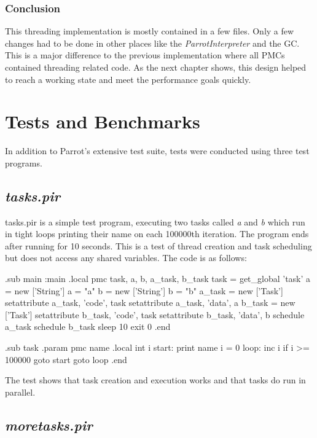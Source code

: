 \documentclass[bachelor,english]{hgbthesis}
\begin{document}
\subsection{Conclusion}

This threading implementation is mostly contained in a few files. Only a few changes had to be done in other places like the \textit{ParrotInterpreter} and the GC. This is a major difference to the previous implementation where all PMCs contained threading related code. As the next chapter shows, this design helped to reach a working state and meet the performance goals quickly.

\chapter{Tests and Benchmarks}

In addition to Parrot's extensive test suite, tests were conducted using three test programs.

\section{\textit{tasks.pir}}

tasks.pir is a simple test program, executing two tasks called \textit{a} and \textit{b} which run in tight loops printing their name on each 100000th iteration. The program ends after running for 10 seconds. This is a test of thread creation and task scheduling but does not access any shared variables. The code is as follows:
%
\begin{GenericCode}
.sub main :main
    .local pmc task, a, b, a_task, b_task
    task = get_global 'task'
    a = new ['String']
    a = "a"
    b = new ['String']
    b = "b"
    a_task = new ['Task']
    setattribute a_task, 'code', task
    setattribute a_task, 'data', a
    b_task = new ['Task']
    setattribute b_task, 'code', task
    setattribute b_task, 'data', b
    schedule a_task
    schedule b_task
    sleep 10
    exit 0
.end

.sub task
    .param pmc name
    .local int i
start:
    print name
    i = 0
loop:
    inc i
    if i >= 100000 goto start
    goto loop
.end
\end{GenericCode}

The test shows that task creation and execution works and that tasks do run in parallel.

\section{\textit{moretasks.pir}}
\end{document}
